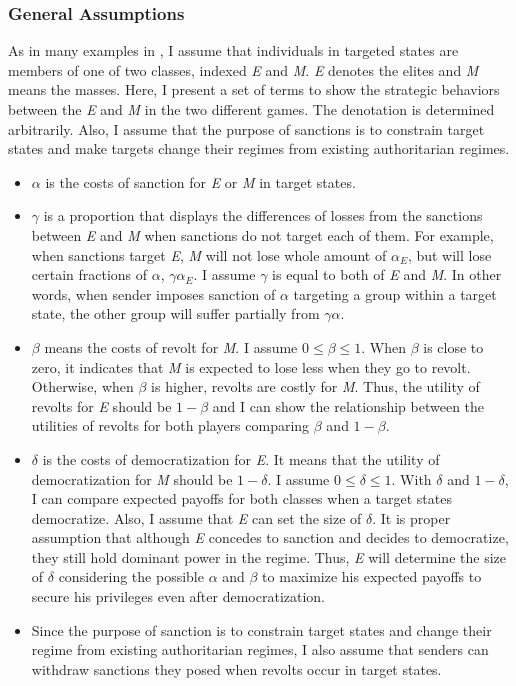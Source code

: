 \documentclass[11pt, letterpage]{article}
\begin{document}
\subsubsection*{General Assumptions}
As in many examples in \cite{Acemoglu2006a}, I assume that individuals in targeted states are members of one of two classes, indexed \textit{E} and \textit{M}. \textit{E} denotes the elites and \textit{M} means the masses. Here, I present a set of terms to show the strategic behaviors between the \textit{E} and \textit{M} in the two different games. The denotation is determined arbitrarily. Also, I assume that the purpose of sanctions is to constrain target states and make targets change their regimes from existing authoritarian regimes.
	
\begin{itemize}
	\item $\alpha$ is the costs of sanction for \textit{E} or \textit{M} in target states. 
	\item $\gamma$ is a proportion that displays the differences of losses from the sanctions between \textit{E} and \textit{M} when sanctions do not target each of them. For example, when sanctions target \textit{E}, \textit{M} will not lose whole amount of $\alpha_{E}$, but will lose certain fractions of $\alpha$, $\gamma\alpha_{E}$. I assume $\gamma$ is equal to both of \textit{E} and \textit{M}. In other words, when sender imposes sanction of $\alpha$ targeting a group within a target state, the other group will suffer partially from $\gamma\alpha$.
	\item $\beta$ means the costs of revolt for \textit{M}. I assume $0\leq \beta \leq 1$. When $\beta$ is close to zero, it indicates that \textit{M} is expected to lose less when they go to revolt. Otherwise, when $\beta$ is higher, revolts are costly for \textit{M}. Thus, the utility of revolts for \textit{E} should be $1-\beta$ and I can show the relationship between the utilities of revolts for both players comparing $\beta$ and $1-\beta$.
	\item $\delta$ is the costs of democratization for \textit{E}. It means that the utility of democratization for \textit{M} should be $1-\delta$. I assume $0\leq \delta \leq 1$. With $\delta$ and $1-\delta$, I can compare expected payoffs for both classes when a target states democratize. Also, I assume that \textit{E} can set the size of $\delta$. It is proper assumption that although \textit{E} concedes to sanction and decides to democratize, they still hold dominant power in the regime. Thus, \textit{E} will determine the size of $\delta$ considering the possible $\alpha$ and $\beta$ to maximize his expected payoffs to secure his privileges even after democratization.
	\item Since the purpose of sanction is to constrain target states and change their regime from existing authoritarian regimes, I also assume that senders can withdraw sanctions they posed when revolts occur in target states.
\end{itemize}
	
\end{document}
